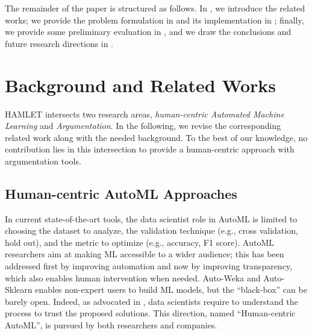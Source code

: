 The remainder of the paper is structured as follows. In , we introduce the related works; we provide the problem formulation in  and its implementation in ; finally, we provide some preliminary evaluation in , and we draw the conclusions and future research directions in .

\section{Background and Related Works}\label{hamlet-sec:related}
HAMLET intersects two research areas, \emph{human-centric Automated Machine Learning} and \emph{Argumentation}.
In the following, we revise the corresponding related work along with the needed background.
To the best of our knowledge, no contribution lies in this intersection to provide a human-centric approach with argumentation tools.

\subsection{Human-centric AutoML Approaches}
In current state-of-the-art tools, the data scientist role in AutoML is limited to choosing the dataset to analyze, the validation technique (e.g., cross validation, hold out), and the metric to optimize (e.g., accuracy, F1 score).
AutoML researchers aim at making ML accessible to a wider audience;
this has been addressed first by improving automation and now by improving transparency, which also enables human intervention when needed.
Auto-Weka \cite{kotthoff2019auto} and Auto-Sklearn \cite{feurer2019auto} enables non-expert users to build ML models, but the ``black-box'' can be barely open.
Indeed, as advocated in \cite{drozdal2020trust}, data scientists require to understand the process to trust the proposed solutions.
This direction, named ``Human-centric AutoML'', is pursued by both researchers and companies.

